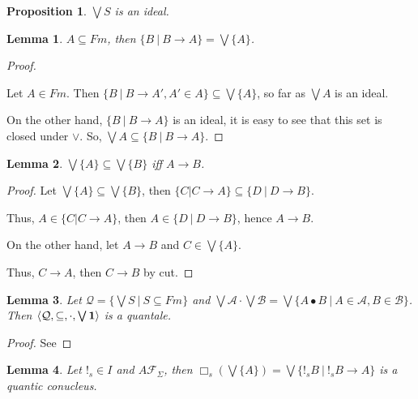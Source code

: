 \documentclass[a4paper]{article}
\theoremstyle{defin}
\theoremstyle{theorem}
\theoremstyle{prop}
\newtheorem{prop}{Proposition}
\theoremstyle{lemma}
\newtheorem{lemma}{Lemma}
\theoremstyle{ex}
\theoremstyle{col}
\begin{document}
\begin{prop}
  $\bigvee S$ is an ideal.
\end{prop}

\begin{lemma}
  $A \subseteq Fm$, then $\{ B \: | \: B \rightarrow A \} = \bigvee \{ A \}$.
\end{lemma}

\begin{proof}
$ $

Let $A \in Fm$. Then $\{ B \: | \: B \rightarrow A', A' \in A \} \subseteq \bigvee \{ A \}$,
so far as $\bigvee A$ is an ideal.

On the other hand, $\{ B \: | \: B \rightarrow A \}$ is an ideal, it is easy to see that this set is closed under $\lor$.
So, $\bigvee A \subseteq \{ B \: | \: B \rightarrow A \}$.
\end{proof}

\begin{lemma}
  $\bigvee \{ A \} \subseteq \bigvee \{ B \}$ iff $A \rightarrow B$.
\end{lemma}

\begin{proof}
  Let $\bigvee \{ A \} \subseteq \bigvee \{ B \}$,
  then $\{ C | C \rightarrow A \} \subseteq \{ D \: | \: D \rightarrow B \}$.

Thus, $A \in \{ C | C \rightarrow A \}$,
then $A \in \{ D \: | \: D \rightarrow B \}$, hence $A \rightarrow B$.

On the other hand, let $A \rightarrow B$ and $C \in \bigvee \{ A \}$.

Thus, $C \rightarrow A$, then $C \rightarrow B$ by cut.

\end{proof}

\begin{lemma}
  Let $\mathcal{Q} = \{ \bigvee S \: | \: S \subseteq Fm \}$ and $\bigvee \mathcal{A} \cdot \bigvee \mathcal{B} =
  \bigvee \{ A \bullet B \: | \: A \in \mathcal{A}, B \in \mathcal{B} \}$.
  Then $\langle \mathcal{Q}, \subseteq, \cdot, \bigvee{{\bf 1}}\rangle$ is a quantale.
\end{lemma}

\begin{proof}
  See
\end{proof}

\begin{lemma}
  Let $!_s \in I$ and $A \mathcal{F}_{\Sigma}$, then $\Box_s (\bigvee \{ A \}) = \bigvee \{ !_s B \: | \: !_s B \rightarrow A \}$
  is a quantic conucleus.
\end{lemma}
\end{document}
